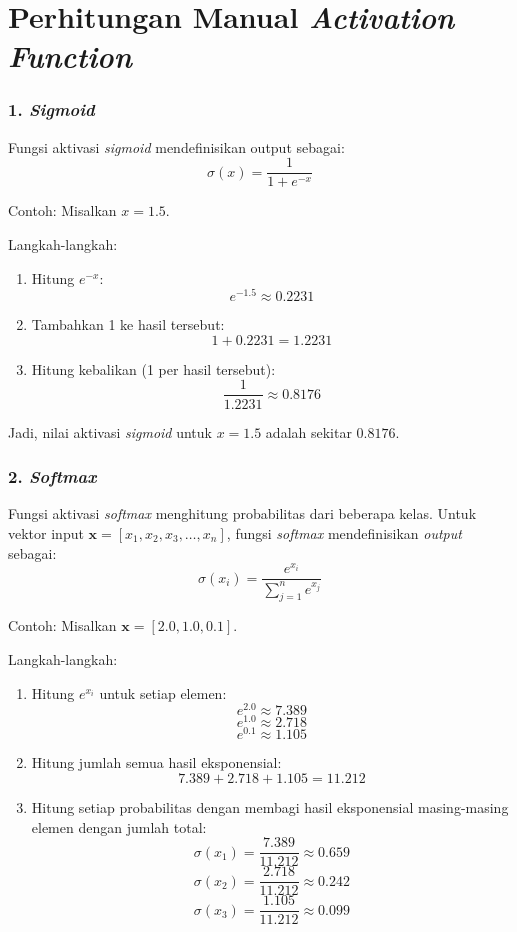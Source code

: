 \chapter{Perhitungan Manual \textit{Activation Function}}

\subsection*{1. \textit{Sigmoid}}
Fungsi aktivasi \textit{sigmoid} mendefinisikan output sebagai:
\[
\sigma(x) = \frac{1}{1 + e^{-x}}
\]

Contoh: Misalkan \( x = 1.5 \).

Langkah-langkah:
\begin{enumerate}
    \item Hitung \( e^{-x} \):
    \[
    e^{-1.5} \approx 0.2231
    \]

    \item Tambahkan 1 ke hasil tersebut:
    \[
    1 + 0.2231 = 1.2231
    \]

    \item Hitung kebalikan (1 per hasil tersebut):
    \[
    \frac{1}{1.2231} \approx 0.8176
    \]
\end{enumerate}

Jadi, nilai aktivasi \textit{sigmoid} untuk \( x = 1.5 \) adalah sekitar \( 0.8176 \).

\subsection*{2. \textit{Softmax}}
Fungsi aktivasi \textit{softmax} menghitung probabilitas dari beberapa kelas. Untuk vektor input \(\mathbf{x} = [x_1, x_2, x_3, \ldots, x_n]\), fungsi \textit{softmax} mendefinisikan \textit{output} sebagai:
\[
\sigma(x_i) = \frac{e^{x_i}}{\sum_{j=1}^{n} e^{x_j}}
\]

Contoh: Misalkan \(\mathbf{x} = [2.0, 1.0, 0.1]\).

Langkah-langkah:
\begin{enumerate}
    \item Hitung \( e^{x_i} \) untuk setiap elemen:
    \[
    e^{2.0} \approx 7.389
    \]
    \[
    e^{1.0} \approx 2.718
    \]
    \[
    e^{0.1} \approx 1.105
    \]

    \item Hitung jumlah semua hasil eksponensial:
    \[
    7.389 + 2.718 + 1.105 = 11.212
    \]

    \item Hitung setiap probabilitas dengan membagi hasil eksponensial masing-masing elemen dengan jumlah total:
    \[
    \sigma(x_1) = \frac{7.389}{11.212} \approx 0.659
    \]
    \[
    \sigma(x_2) = \frac{2.718}{11.212} \approx 0.242
    \]
    \[
    \sigma(x_3) = \frac{1.105}{11.212} \approx 0.099
    \]
\end{enumerate}

